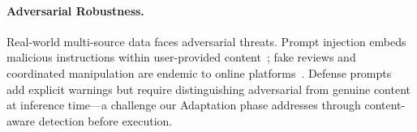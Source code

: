 \paragraph{Adversarial Robustness.}
Real-world multi-source data faces adversarial threats.
Prompt injection embeds malicious instructions within user-provided content~\cite{perez2022ignore,greshake2023not};
fake reviews and coordinated manipulation are endemic to online platforms~\cite{mukherjee2013yelp}.
Defense prompts~\cite{jain2023baseline} add explicit warnings but require distinguishing adversarial from genuine content at inference time---a challenge our Adaptation phase addresses through content-aware detection before execution.